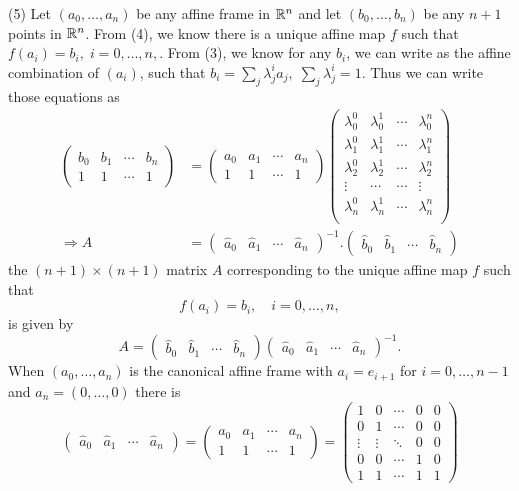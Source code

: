 \documentclass[12pt]{article}
\begin{document}
 
\medskip
(5)
Let $(a_0, \ldots, a_n)$ be any affine frame in $\mathbb{R}^n$ and
let $(b_0, \ldots, b_n)$ be any $n + 1$ points in $\mathbb{R}^n$. 
From (4), we know there is a unique affine map $f$ such that $
f(a_i) = b_i, \; i = 0, \ldots, n, 
$. From (3), we know for any $b_i$, we can write as the affine combination of $(a_i)$, such that $b_i = \sum_j \lambda_j^i a_j, \; \sum_j \lambda_j^i = 1$. Thus we can write those equations as
\begin{align*}
\begin{pmatrix}
b_0 & b_1& \cdots& b_n \\
1 & 1 & \cdots & 1 
\end{pmatrix} &=
\begin{pmatrix}
a_0 & a_1& \cdots& a_n \\
1 & 1 & \cdots & 1 
\end{pmatrix} 
\begin{pmatrix}
\lambda_0^0 & \lambda_0^1 & \cdots& \lambda_0^n \\
\lambda_1^0 & \lambda_1^1 & \cdots& \lambda_1^n \\
\lambda_2^0 & \lambda_2^1 & \cdots& \lambda_2^n \\
\vdots & \cdots & \cdots & \vdots \\
\lambda_n^0 & \lambda_n^1 & \cdots& \lambda_n^n \\
\end{pmatrix} \\
\Rightarrow 
A &= 
\begin{pmatrix}
\widehat{a}_0 & \widehat{a}_1 & \cdots & \widehat{a}_n   
\end{pmatrix}^{-1}.
\begin{pmatrix}
\widehat{b}_0 & \widehat{b}_1 & \cdots & \widehat{b}_n   
\end{pmatrix}
\end{align*}
the $(n + 1)\times (n + 1)$ matrix $A$ corresponding to
the unique affine map $f$
such that 
\[
f(a_i) = b_i, \quad i = 0, \ldots, n, 
\]
is given by
\[
A = 
\begin{pmatrix}
\widehat{b}_0 & \widehat{b}_1 & \cdots & \widehat{b}_n   
\end{pmatrix}
\begin{pmatrix}
\widehat{a}_0 & \widehat{a}_1 & \cdots & \widehat{a}_n   
\end{pmatrix}^{-1}.
\]
When $(a_0, \ldots, a_n)$ is the canonical  affine frame with 
$a_i = e_{i+1}$ for $i = 0, \ldots, n - 1$ and
$a_n = (0, \ldots, 0)$ there is 
\[
\begin{pmatrix}
\widehat{a}_0 & \widehat{a}_1 & \cdots & \widehat{a}_n   
\end{pmatrix}
=
\begin{pmatrix}
a_0 & a_1 & \cdots & a_n   \\
1 & 1 & \cdots & 1 
\end{pmatrix}
=
\begin{pmatrix}
1  & 0 & \cdots & 0 & 0 \\
0  & 1 & \cdots & 0 & 0\\
\vdots & \vdots & \ddots & 0 & 0 \\
0  &  0  & \cdots & 1 & 0 \\
1  &  1  & \cdots & 1 & 1
\end{pmatrix}
\] 
\end{document}

